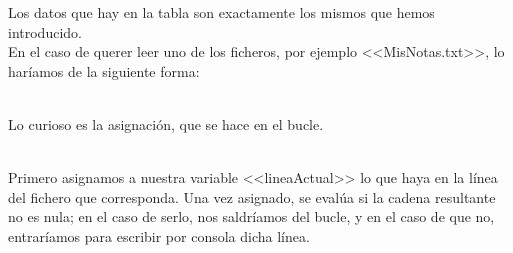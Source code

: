 \documentclass[11pt, oneside]{book}		%
\begin{document}
	Los datos que hay en la tabla son exactamente los mismos que hemos introducido.\\
	En el caso de querer leer uno de los ficheros, por ejemplo <<MisNotas.txt>>, lo haríamos de la siguiente forma:
	\\\\\begin{minipage}[c]{0.95\textwidth}
		
	\end{minipage}
	Lo curioso es la asignación, que se hace en el bucle.
	\\\\\begin{minipage}[c]{0.95\textwidth}
		
	\end{minipage}
	Primero asignamos a nuestra variable <<lineaActual>> lo que haya en la línea del fichero que corresponda. Una vez asignado, se evalúa si la cadena resultante no es nula; en el caso de serlo, nos saldríamos del bucle, y en el caso de que no, entraríamos para escribir por consola dicha línea.
	\\\\\begin{minipage}[c]{0.95\textwidth}
		
	\end{minipage}
\end{document}
